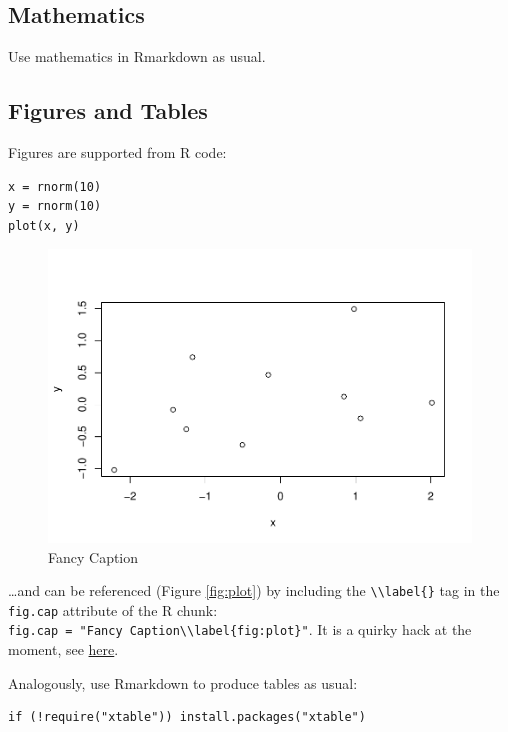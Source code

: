 \documentclass[Royal,times,sageh]{sagej}
\begin{document}
\hypertarget{mathematics}{%
\subsection{Mathematics}\label{mathematics}}

Use mathematics in Rmarkdown as usual.

\hypertarget{figures-and-tables}{%
\subsection{Figures and Tables}\label{figures-and-tables}}

Figures are supported from R code:

\begin{verbatim}
x = rnorm(10)
y = rnorm(10)
plot(x, y)
\end{verbatim}

\begin{figure}
\includegraphics[width=1\linewidth]{Manuscrip-Data-Package_files/figure-latex/plot-ref-1} \caption{Fancy Caption\label{fig:plot}}\label{fig:plot-ref}
\end{figure}

\ldots and can be referenced (Figure \ref{fig:plot}) by including the
\texttt{\textbackslash{}\textbackslash{}label\{\}} tag in the
\texttt{fig.cap} attribute of the R chunk:
\texttt{fig.cap\ =\ "Fancy\ Caption\textbackslash{}\textbackslash{}label\{fig:plot\}"}.
It is a quirky hack at the moment, see
\href{https://github.com/yihui/knitr/issues/323}{here}.

Analogously, use Rmarkdown to produce tables as usual:

\begin{verbatim}
if (!require("xtable")) install.packages("xtable")
\end{verbatim}
\end{document}
